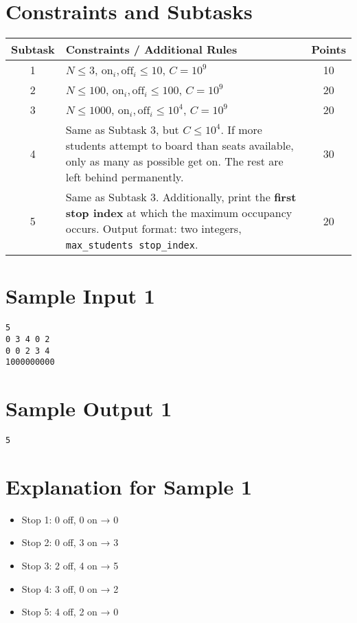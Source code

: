 \documentclass[12pt,a4paper]{article}
\begin{document}
\section*{Constraints and Subtasks}
\begin{center}
\begin{tabularx}{\textwidth}{|c|X|c|}
\hline
\textbf{Subtask} & \textbf{Constraints / Additional Rules} & \textbf{Points} \\
\hline
1 & $N \leq 3$, $\text{on}_i, \text{off}_i \leq 10$, $C = 10^9$ & 10 \\
\hline
2 & $N \leq 100$, $\text{on}_i, \text{off}_i \leq 100$, $C = 10^9$ & 20 \\
\hline
3 & $N \leq 1000$, $\text{on}_i, \text{off}_i \leq 10^4$, $C = 10^9$ & 20 \\
\hline
4 & Same as Subtask 3, but $C \leq 10^4$. If more students attempt to board than seats available, only as many as possible get on. The rest are left behind permanently. & 30 \\
\hline
5 & Same as Subtask 3. Additionally, print the \textbf{first stop index} at which the maximum occupancy occurs. Output format: two integers, \texttt{max\_students stop\_index}. & 20 \\
\hline
\end{tabularx}
\end{center}

\section*{Sample Input 1}
\begin{verbatim}
5
0 3 4 0 2
0 0 2 3 4
1000000000
\end{verbatim}

\section*{Sample Output 1}
\begin{verbatim}
5
\end{verbatim}

\section*{Explanation for Sample 1}
\begin{itemize}
  \item Stop 1: 0 off, 0 on → 0  
  \item Stop 2: 0 off, 3 on → 3  
  \item Stop 3: 2 off, 4 on → 5  
  \item Stop 4: 3 off, 0 on → 2  
  \item Stop 5: 4 off, 2 on → 0  
\end{itemize}
\end{document}
